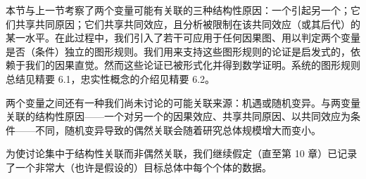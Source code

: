 \begin{figure}[htbp]
\centering
{}
\caption{}
\label{fig:6.8}
\end{figure}


本节与上一节考察了两个变量可能有关联的三种结构性原因：一个引起另一个；它们共享共同原因；它们共享共同效应，且分析被限制在该共同效应（或其后代）的某一水平。在此过程中，我们引入了若干可应用于任何因果图、用以判定两个变量是否（条件）独立的图形规则。我们用来支持这些图形规则的论证是启发式的，依赖于我们的因果直觉。然而这些论证已被形式化并得到数学证明。系统的图形规则总结见精要 6.1，忠实性概念的介绍见精要 6.2。


两个变量之间还有一种我们尚未讨论的可能关联来源：机遇或随机变异。与两变量关联的结构性原因——一个对另一个的因果效应、共享共同原因、以共同效应为条件——不同，随机变异导致的偶然关联会随着研究总体规模增大而变小。

为使讨论集中于结构性关联而非偶然关联，我们继续假定（直至第 10 章）已记录了一个非常大（也许是假设的）目标总体中每个个体的数据。

